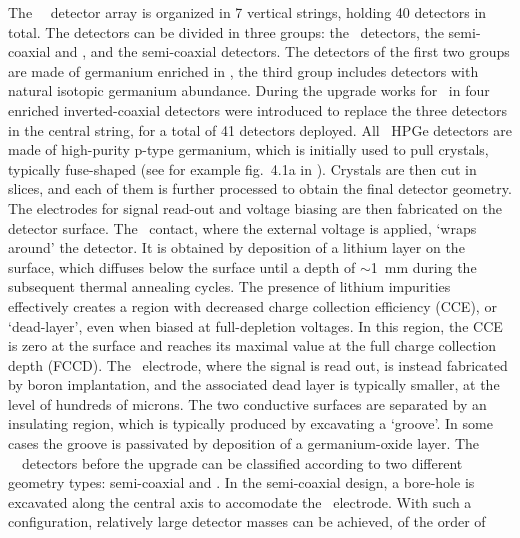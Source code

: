 The \gerda\ \phasetwo\ detector array is organized in 7 vertical strings, holding 40 detectors in
total. The detectors can be divided in three groups: the \bege\ detectors, the
semi-coaxial  and , and the semi-coaxial  detectors. The detectors of
the first two groups are made of germanium enriched in \gesix, the third group includes
detectors with natural isotopic germanium abundance. During the upgrade works for
\phasetwop\ in  four enriched inverted-coaxial \IC{} detectors were introduced to
replace the three \GTF{} detectors in the central string, for a total of 41 detectors
deployed.
\newpar
All \gerda\ HPGe detectors are made of high-purity p-type germanium, which is initially
used to pull crystals, typically fuse-shaped (see for example fig.~4.1a in
\cite{Yonenaga2019}).  Crystals are then cut in slices, and each of them is further
processed to obtain the final detector geometry. The electrodes for signal read-out and
voltage biasing are then fabricated on the detector surface. The \nplus\ contact, where the
external voltage is applied, `wraps around' the detector. It is obtained by deposition of
a lithium layer on the surface, which diffuses below the surface until a depth of
$\sim$1~mm during the subsequent thermal annealing cycles. The presence of lithium
impurities effectively creates a region with decreased charge collection efficiency (CCE),
or `dead-layer', even when biased at full-depletion voltages.  In this region, the CCE is
zero at the surface and reaches its maximal value at the full charge collection depth
(FCCD). The \pplus\ electrode, where the signal is read out, is instead fabricated by boron
implantation, and the associated dead layer is typically smaller, at the level of
hundreds of microns. The two conductive surfaces are separated by an insulating region,
which is typically produced by excavating a `groove'. In some cases the groove is
passivated by deposition of a germanium-oxide layer.
\newpar
{}
The \gerda\ \phasetwo\ detectors before the  upgrade can be classified according to
two different geometry types: semi-coaxial and \bege. In the semi-coaxial design, a
bore-hole is excavated along the central axis to accomodate the \pplus\ electrode. With
such a configuration, relatively large detector masses can be achieved, of the order of
